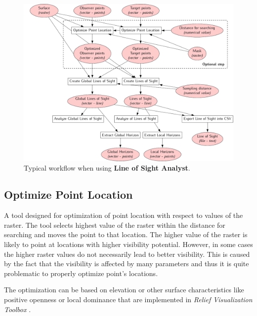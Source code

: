\documentclass[]{article}
\begin{document}
\begin{figure}
	\centering
	\includegraphics[width=\textwidth]{./images/workflow.pdf}
	\caption {Typical workflow when using \textbf{Line of Sight Analyst}.}
	\label{Fig:Workflow}
\end{figure} 

\subsection{Optimize Point Location}

A tool designed for optimization of point location with respect to values of the raster. The tool selects highest value of the raster within the distance for searching and moves the point to that location. The higher value of the raster is likely to point at locations with higher visibility potential. However, in some cases the higher raster values do not necessarily lead to better visibility. This is caused by the fact that the visibility is affected by many parameters and thus it is quite problematic to properly optimize point's locations.

The optimization can be based on elevation or other surface characteristics like positive openness or local dominance that are implemented in \textit{Relief Visualization Toolbox} \citep{Kokalj2016}.
\end{document}
